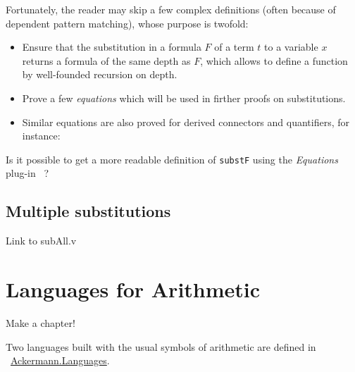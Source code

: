 Fortunately, the reader may skip a few complex definitions 
(often because of dependent pattern matching), whose purpose
is twofold:
\begin{itemize}
\item Ensure that the substitution in a formula $F$ of a term $t$ to a variable $x$ returns a formula of the same depth as $F$,
  which allows to define a function by well-founded recursion on depth.
\item Prove a few \emph{equations} which will be used in firther proofs on substitutions.


\item Similar equations are also proved for derived connectors and quantifiers, for instance:


\end{itemize}


\begin{project}
  Is it possible to get a more readable definition of \texttt{substF} using the \emph{Equations} plug-in~\cite{sozeau:hal-01671777} ? 
\end{project}




\subsection{Multiple substitutions}

\begin{todo}
Link to subAll.v
\end{todo}


\section{Languages for Arithmetic}

\begin{todo}
Make a chapter!
\end{todo}

Two languages built with the usual symbols of arithmetic are 
defined in ~\href{../theories/html/hydras.Ackermann.Languages.html}{Ackermann.Languages}.

